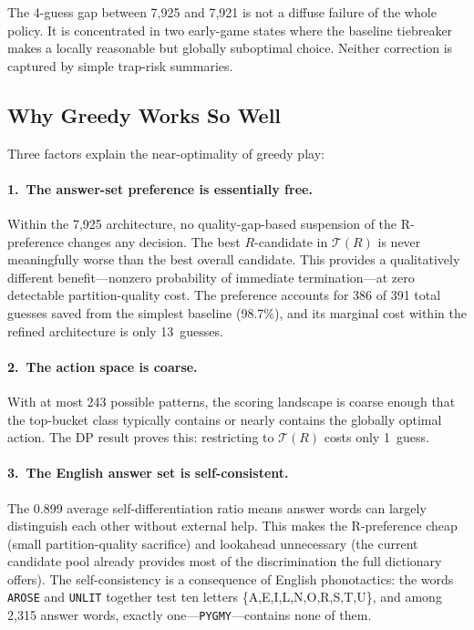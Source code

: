 \documentclass[11pt]{article}
\begin{document}
	The 4-guess gap between 7,925 and 7,921 is not a diffuse failure of the whole policy.  It is concentrated in two early-game states where the baseline tiebreaker makes a locally reasonable but globally suboptimal choice.  Neither correction is captured by simple trap-risk summaries.
	
	\subsection{Why Greedy Works So Well}
	
	Three factors explain the near-optimality of greedy play:
	
	\paragraph{1.\ The answer-set preference is essentially free.}
	Within the 7,925 architecture, no quality-gap-based suspension of the R-preference changes any decision.  The best $R$-candidate in $\mathcal{T}(R)$ is never meaningfully worse than the best overall candidate.  This provides a qualitatively different benefit---nonzero probability of immediate termination---at zero detectable partition-quality cost.  The preference accounts for 386 of 391 total guesses saved from the simplest baseline (98.7\%), and its marginal cost within the refined architecture is only 13~guesses.
	
	\paragraph{2.\ The action space is coarse.}
	With at most 243 possible patterns, the scoring landscape is coarse enough that the top-bucket class typically contains or nearly contains the globally optimal action.  The DP result proves this: restricting to $\mathcal{T}(R)$ costs only 1~guess.
	
	\paragraph{3.\ The English answer set is self-consistent.}
	The 0.899 average self-differentiation ratio means answer words can largely distinguish each other without external help.  This makes the R-preference cheap (small partition-quality sacrifice) and lookahead unnecessary (the current candidate pool already provides most of the discrimination the full dictionary offers).  The self-consistency is a consequence of English phonotactics: the words \texttt{AROSE} and \texttt{UNLIT} together test ten letters \{A,E,I,L,N,O,R,S,T,U\}, and among 2,315 answer words, exactly one---\texttt{PYGMY}---contains none of them.
	
\end{document}
